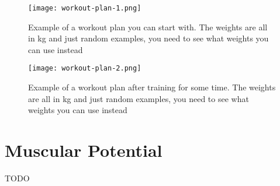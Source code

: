 \documentclass[openany, 12pt]{book}
\begin{document}
	\begin{figure}[h]
		\centering
		\texttt{[image: workout-plan-1.png]}
		\caption{Example of a workout plan you can start with. The weights are all in kg and just random examples, you need to see what weights you can use instead}
		\label{fig10}
	\end{figure}

	\begin{figure}[h]
		\centering
		\texttt{[image: workout-plan-2.png]}
		\caption{Example of a workout plan after training for some time. The weights are all in kg and just random examples, you need to see what weights you can use instead}
		\label{fig11}
	\end{figure}

        \section{Muscular Potential}

        TODO
        
\end{document}

